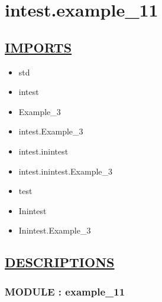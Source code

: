\chapter*{intest.example\_11}

\section*{\underline{IMPORTS}}
\begin{itemize}
\item std
\item intest
\item Example\_3
\item intest.Example\_3
\item intest.inintest
\item intest.inintest.Example\_3
\item test
\item Inintest
\item Inintest.Example\_3
\end{itemize}

\section*{\underline{DESCRIPTIONS}}
\subsection*{MODULE : example\_11}
\hypertarget{ecldoc:intest.example_11_intest.example_11}{}
